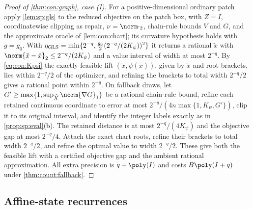\begin{proof}[Proof of \cref{thm:con:graph}, case (I)]
For a positive-dimensional ordinary patch apply \cref{lem:sp:gls} to the reduced
objective on the patch box, with $Z=I$, coordinatewise clipping as repair,
$\nu=\norm\cdot_2$, chain-rule bounds $V$ and $G$, and the approximate oracle
of \cref{lem:con:chart}; its curvature hypothesis holds with $g=g_0$. With
$\eta_{\rm GLS}=\min\{2^{-q},\frac{g_0}2(2^{-q}/(2K_\psi))^2\}$ it returns a
rational $\tilde x$ with $\norm{\tilde x-\hat x}_2\le2^{-q}/(2K_\psi)$ and a
value interval of width at most $2^{-q}$. By \eqref{eq:con:Kpsi} the exactly
feasible lift $(\tilde x,\psi(\tilde x))$, given by $\tilde x$ and root
brackets, lies within $2^{-q}/2$ of the optimizer, and refining the brackets to
total width $2^{-q}/2$ gives a rational point within $2^{-q}$. On fallback
draws, let $G'\ge\max\{1,\sup_{\widehat X}\norm{\nabla G}_1\}$ be a rational
chain-rule bound, refine each retained continuous coordinate to error at
most $2^{-q}/(4n\max\{1,K_\psi,G'\})$, clip it to its original interval,
and identify the integer labels exactly as in \cref{prop:sp:eval}(b).
The retained distance is at most $2^{-q}/(4K_\psi)$ and the objective gap
at most $2^{-q}/4$. Attach the exact chart roots, refine their brackets to
total width $2^{-q}/2$, and refine the optimal value to width $2^{-q}/2$.
These give both the feasible lift with a certified objective gap and the
ambient rational approximation. All extra precision is $q+\poly(I)$ and
costs $B\poly(I+q)$ under \cref{thm:count:fallback}.
\end{proof}

\subsection{Affine-state recurrences}\label{app:con:actuator}


